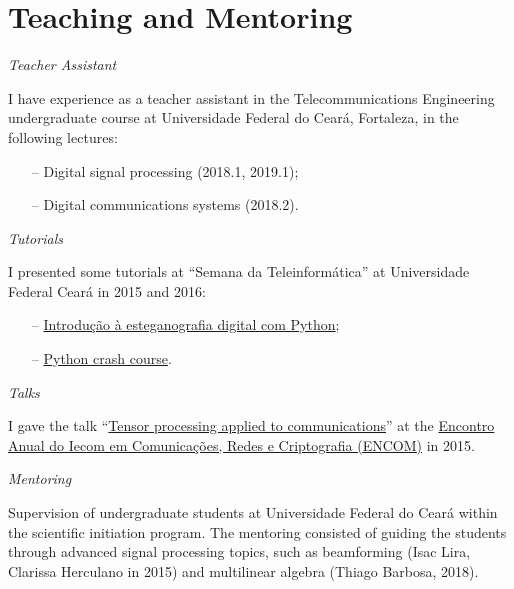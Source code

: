 \section{Teaching and Mentoring}

{\sl Teacher Assistant} 

I have experience as a teacher assistant in the Telecommunications Engineering undergraduate course at Universidade Federal do Cear\'a, Fortaleza, in the following lectures:
\begin{itemize}
	\item[--] Digital signal processing (2018.1, 2019.1);
	\item[--] Digital communications systems (2018.2).
\end{itemize}

{\sl Tutorials}

I presented some tutorials at ``Semana da Teleinformática'' at Universidade Federal Cear\'a in 2015 and 2016:
\begin{itemize}
	\item[--] \href{https://github.com/lnribeiro/setic2015/blob/master/esteganografia.ipynb}{Introdução à esteganografia digital com Python};
	\item[--] \href{https://github.com/lnribeiro/setic2015/blob/master/intropython.ipynb}{Python crash course}.
\end{itemize}

{\sl Talks}

I gave the talk ``\href{https://github.com/lnribeiro/lnribeiro.github.io/blob/master/assets/pdf/encom15.pdf}{Tensor processing applied to communications}'' at the \href{https://iecom.org.br/encom2015/#}{Encontro Anual do Iecom em Comunicaç\~{o}es, Redes e Criptografia (ENCOM)} in 2015.

{\sl Mentoring}

Supervision of undergraduate students at Universidade Federal do Cear\'a within the scientific initiation program. The mentoring consisted of guiding the students through advanced signal processing topics, such as beamforming (Isac Lira, Clarissa Herculano in 2015) and multilinear algebra (Thiago Barbosa, 2018).